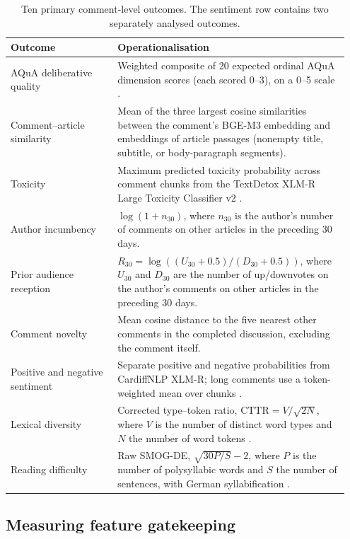 \begin{table}[t]
\centering
\small
\begin{tabular}{@{}p{0.30\linewidth}p{0.65\linewidth}@{}}
\toprule
Outcome & Operationalisation \\
\midrule
AQuA deliberative quality & Weighted composite of 20 expected ordinal AQuA dimension scores (each scored 0--3), on a 0--5 scale \citep{Behrendt2024}. \\
Comment--article similarity & Mean of the three largest cosine similarities between the comment's BGE-M3 embedding and embeddings of article passages (nonempty title, subtitle, or body-paragraph segments). \\
Toxicity & Maximum predicted toxicity probability across comment chunks from the TextDetox XLM-R Large Toxicity Classifier v2 \citep{textdetox2024xlmr}. \\
Author incumbency & $\log(1+n_{30})$, where $n_{30}$ is the author's number of comments on other articles in the preceding 30 days. \\
Prior audience reception & $R_{30} = \log\!\left((U_{30}+0.5)/(D_{30}+0.5)\right)$, where $U_{30}$ and $D_{30}$ are the number of up/downvotes on the author's comments on other articles in the preceding 30 days. \\
Comment novelty & Mean cosine distance to the five nearest other comments in the completed discussion, excluding the comment itself. \\
Positive and negative sentiment & Separate positive and negative probabilities from CardiffNLP XLM-R; long comments use a token-weighted mean over chunks \citep{cardiffnlp2022xlmr}. \\
Lexical diversity & Corrected type--token ratio, $\mathrm{CTTR}=V/\sqrt{2N}$, where $V$ is the number of distinct word types and $N$ the number of word tokens \citep{Benoit2018}. \\
Reading difficulty & Raw SMOG-DE, $\sqrt{30P/S}-2$, where $P$ is the number of polysyllabic words and $S$ the number of sentences, with German syllabification \citep{Benoit2018,bamberger1984lesen}. \\
\bottomrule
\end{tabular}
\caption{Ten primary comment-level outcomes. The sentiment row contains two separately analysed outcomes.}
\label{tab:outcome-features}
\end{table}

\subsection{Measuring feature gatekeeping}
